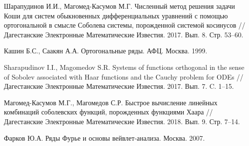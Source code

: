 \begin{thebibliography}{111}
Шарапудинов И.И., Магомед-Касумов М.Г. Численный метод решения задачи Коши для систем обыкновенных дифференциальных уравнений с помощью ортогональной в смысле Соболева системы, порожденной системой косинусов // Дагестанские Электронные Математические Известия. 2017. Вып. 8. Стр. 53--60.

Кашин Б.С., Саакян А.А. Ортогональные ряды. АФЦ. Москва. 1999.

Sharapudinov I.I., Magomedov S.R. Systems of functions orthogonal in the sense of Sobolev associated with Haar functions and the Cauchy problem for ODEs // Дагестанские Электронные Математические Известия. 2017. Вып. 7. C. 1--15.

Магомед-Касумов М.Г., Магомедов С.Р. Быстрое вычисление линейных комбинаций соболевских функций, порожденных функциями Хаара // Дагестанские Электронные Математические Известия. 2018. Вып. 9. Стр. 7--14.

Фарков Ю.А. Ряды Фурье и основы вейвлет-анализа. Москва. 2007.

\end{thebibliography}
